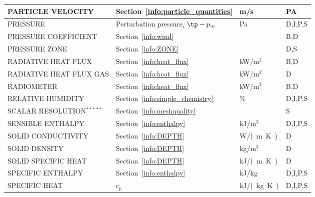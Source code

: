 \documentclass[11pt]{book}
\begin{document}
\begin{longtable}{@{\extracolsep{\fill}}|l|l|l|l|}
{\ct PARTICLE VELOCITY}                         & Section~\ref{info:particle_quantities}        & m/s            & PA           \\ \hline
{\ct PRESSURE}                                  & Perturbation pressure, $\tp-p_\infty$         & Pa             & D,I,P,S      \\ \hline
{\ct PRESSURE COEFFICIENT}                      & Section~\ref{info:wind}                       &                & B,D          \\ \hline
{\ct PRESSURE ZONE}                             & Section~\ref{info:ZONE}                       &                & D,S          \\ \hline
{\ct RADIATIVE HEAT FLUX}                       & Section~\ref{info:heat_flux}                  & kW/m$^2$       & B,D          \\ \hline
{\ct RADIATIVE HEAT FLUX GAS}                   & Section~\ref{info:heat_flux}                  & kW/m$^2$       & D            \\ \hline
{\ct RADIOMETER}                                & Section~\ref{info:heat_flux}                  & kW/m$^2$       & B,D          \\ \hline
{\ct RELATIVE HUMIDITY}                         & Section~\ref{info:simple_chemistry}           & \%             & D,I,P,S      \\ \hline
{\ct SCALAR RESOLUTION}$^{*****}$               & Section~\ref{info:meshquality}                &                & S            \\ \hline
{\ct SENSIBLE ENTHALPY}                         & Section~\ref{info:enthalpy}                   & kJ/m$^3$       & D,I,P,S      \\ \hline
{\ct SOLID CONDUCTIVITY}                        & Section~\ref{info:DEPTH}                      & \si{W/(m.K)}   & D            \\ \hline
{\ct SOLID DENSITY}                             & Section~\ref{info:DEPTH}                      & kg/m$^3$       & D            \\ \hline
{\ct SOLID SPECIFIC HEAT}                       & Section~\ref{info:DEPTH}                      & \si{kJ/(m.K)}  & D            \\ \hline
{\ct SPECIFIC ENTHALPY}                         & Section~\ref{info:enthalpy}                   & kJ/kg          & D,I,P,S      \\ \hline
{\ct SPECIFIC HEAT}                             & $c_p$                                         & \si{kJ/(kg.K)} & D,I,P,S      \\ \hline

\end{longtable}
\end{document}
